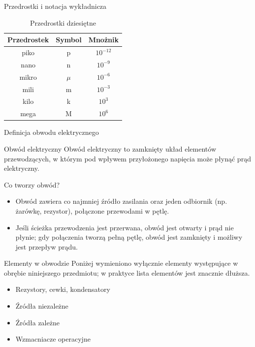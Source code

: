 \begin{frame}{Przedrostki i notacja wykładnicza}
	\begin{table}
		\centering
		\caption{Przedrostki dziesiętne}
		\begin{tabular}{|c|c|c|}
			\hline
			Przedrostek & Symbol & Mnożnik    \\ \hline
			piko        & p      & $10^{-12}$ \\ \hline
			nano        & n      & $10^{-9}$  \\ \hline
			mikro       & $\mu$  & $10^{-6}$  \\ \hline
			mili        & m      & $10^{-3}$  \\ \hline
			kilo        & k      & $10^{3}$   \\ \hline
			mega        & M      & $10^{6}$   \\ \hline
		\end{tabular}
	\end{table}
\end{frame}

\begin{frame}{Definicja obwodu elektrycznego}
	\begin{block}{Obwód elektryczny}
		Obwód elektryczny to zamknięty układ elementów przewodzących, w którym
		pod wpływem przyłożonego napięcia może płynąć prąd elektryczny.
	\end{block}
	Co tworzy obwód?
	\begin{itemize}
		\item[\bt] Obwód zawiera co najmniej źródło zasilania oraz jeden odbiornik
		      (np. żarówkę, rezystor), połączone przewodami w pętlę.
		\item[\bt] Jeśli ścieżka przewodzenia jest przerwana, obwód jest otwarty i prąd nie płynie;
		      gdy połączenia tworzą pełną pętlę, obwód jest zamknięty i możliwy jest przepływ prądu.
	\end{itemize}
\end{frame}

\begin{frame}{Elementy w obwodzie}
	Poniżej wymieniono wyłącznie elementy występujące w obrębie niniejszego przedmiotu;
	w praktyce lista elementów jest znacznie dłuższa.
	\begin{itemize}
		\item[\bt] Rezystory, cewki, kondensatory
		\item[\bt] Źródła niezależne
		\item[\bt] Źródła zależne
		\item[\bt] Wzmacniacze operacyjne
	\end{itemize}
\end{frame}

